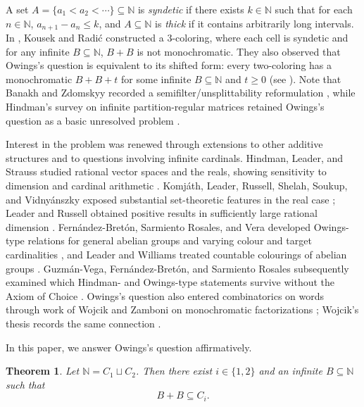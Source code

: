 \documentclass[reqno,12pt]{amsart}
\newtheorem{thm}{Theorem}[section]
\def \N {\mathbb N}
\numberwithin{equation}{section}
\begin{document}
A set $A=\{a_1<a_2<\cdots\}\subseteq \N$ is {\em syndetic} if there exists $k\in \N$ such that for each $n\in\N$, $a_{n+1}-a_n\le k$, and  $A\subseteq \N$ is {\em thick} if it contains arbitrarily long
intervals.
In \cite[Proposition 1.5]{KousekRadic24}, Kousek and Radi{\'c} constructed a $3$-coloring, where each cell is syndetic and for any infinite $B\subseteq \N$, $B+B$ is not monochromatic. They also observed that Owings's question is
equivalent to its shifted form: every two-coloring has a monochromatic
$B+B+t$ for some infinite $B\subseteq\N$ and $t\ge0$ (see \cite[Remark 6.2]{KousekRadic24}). Note that Banakh and Zdomskyy recorded
a semifilter/unsplittability reformulation \cite[Section~28]{BanakhZdomskyy2006}, while
Hindman's survey on infinite partition-regular matrices retained Owings's question as a
basic unresolved problem \cite[p.~211]{Hindman2018Matrices}.

Interest in the problem was renewed through extensions to other additive
structures and to questions involving infinite cardinals.   Hindman, Leader, and Strauss
studied rational vector spaces and the reals, showing sensitivity to dimension
and cardinal arithmetic \cite{HindmanLeaderStrauss2017}.  Komj\'ath, Leader,
Russell, Shelah, Soukup, and Vidny\'anszky exposed substantial set-theoretic
features in the real case \cite{KomjathEtAl2019}; Leader and Russell obtained
positive results in sufficiently large rational dimension
\cite{LeaderRussell2020}.  Fern\'andez-Bret\'on, Sarmiento Rosales, and Vera
developed Owings-type relations for general abelian groups and varying colour
and target cardinalities \cite{FernandezEtAl2024}, and Leader and Williams
treated countable colourings of abelian groups \cite{LeaderWilliams2024}.
Guzm\'an-Vega, Fern\'andez-Bret\'on, and Sarmiento Rosales subsequently examined
which Hindman- and Owings-type statements survive without the Axiom of Choice
\cite{GuzmanEtAl2026}. Owings's question also entered combinatorics on words through work of Wojcik and Zamboni on
monochromatic factorizations \cite{WojcikZamboni2018Periodicity,
WojcikZamboni2018Words}; Wojcik's thesis records the same connection
\cite{Wojcik2019Thesis}.

In this paper, we answer Owings's question affirmatively.
\begin{thm}\label{main1}
Let $\N=C_1\sqcup C_2$. Then there exist $i\in \{1,2\}$ and an infinite $B\subseteq \N$ such that
$$B+B\subseteq C_i.$$
\end{thm}
\end{document}
